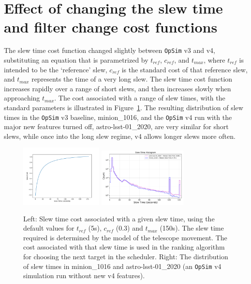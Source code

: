 \documentclass[DM,lsstdraft,authoryear,toc]{lsstdoc}
\newcommand{\opsim}{\texttt{OpSim}\xspace}
\begin{document}
\section{Effect of changing the slew time and filter change cost functions}

The slew time cost function changed slightly between \opsim v3 and v4, substituting an equation that is parametrized by $t_{ref}$, $c_{ref}$, and $t_{max}$, where $t_{ref}$ is intended to be the `reference' slew, $c_{ref}$ is the standard cost of that reference slew, and $t_{max}$ represents the time of a very long slew. The slew time cost function increases rapidly over a range of short slews, and then increases slowly when approaching $t_{max}$.  The cost associated with a range of slew times, with the standard parameters is illustrated in Figure~\ref{fig:slewcost}.  The resulting distribution of slew times in the \opsim v3 baseline, minion\_1016, and the \opsim v4 run with the major new features turned off, astro-lsst-01\_2020, are very similar for short slews, while once into the long slew regime, v4 allows longer slews more often.

\begin{figure}[ht]
\centering
\includegraphics[width=0.37\textwidth]{figures/slewcost}
\includegraphics[width=0.4\textwidth]{figures/slewtimes}
\caption{Left: Slew time cost associated with a given slew time, using the default values for $t_{ref}$ (5s), $c_{ref}$ (0.3) and $t_{max}$ (150s). The slew time required is determined by the model of the telescope movement. The cost associated with that slew time is used in the ranking algorithm for choosing the next target in the scheduler. Right: The distribution of slew times in minion\_1016 and astro-lsst-01\_2020 (an \opsim v4 simulation run without new v4 features).
\label{fig:slewcost}}
\end{figure}
\end{document}
